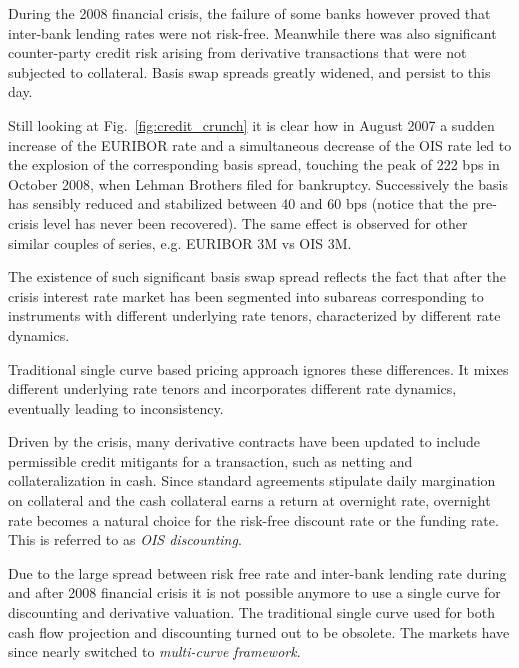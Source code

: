 During the 2008 financial crisis, the failure of some banks however proved that inter-bank lending rates were not risk-free. Meanwhile there was also significant counter-party credit risk arising from derivative transactions that were not subjected to collateral. Basis swap spreads greatly widened, and persist to this day. 

Still looking at Fig.~\ref{fig:credit_crunch} it is clear how in August 2007 a sudden increase of the EURIBOR rate and a simultaneous decrease of the OIS rate led to the explosion of the corresponding basis spread, touching the peak of 222 bps in October 2008, when Lehman Brothers filed for bankruptcy. Successively the basis has sensibly reduced and stabilized between 40 and 60 bps (notice that the pre-crisis level has never been recovered). The same effect is observed for other similar couples of series, e.g. EURIBOR 3M vs OIS 3M.

The existence of such significant basis swap spread reflects the fact that after the crisis interest rate market has been segmented into subareas corresponding to instruments with different underlying rate tenors, characterized by different rate dynamics. 

Traditional single curve based pricing approach ignores these differences. It mixes different underlying rate tenors and incorporates different rate dynamics, eventually leading to inconsistency.

Driven by the crisis, many derivative contracts have been updated to include permissible credit mitigants for a transaction, such as netting and collateralization in cash. Since standard agreements stipulate daily margination on collateral and the cash collateral earns a return at overnight rate, overnight rate becomes a natural choice for the risk-free discount rate or the funding rate. This is referred to as \emph{OIS discounting}.

Due to the large spread between risk free rate and inter-bank lending rate during and after 2008 financial crisis it is not possible anymore to use a single curve for discounting and derivative valuation. The traditional single curve used for both cash flow projection and discounting turned out to be obsolete. The markets have since nearly switched to \emph{multi-curve framework}. 


